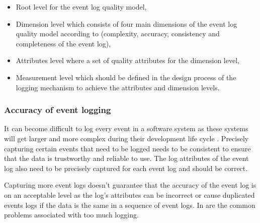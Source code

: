 \begin{itemize}
	\item Root level for the event log quality model,
	\item Dimension level which consists of four main dimensions of the event log quality model according to \cite{Kherbouche2017} (complexity, accuracy, consistency and completeness of the event log),
	\item Attributes level where a set of quality attributes for the dimension level,
	\item Measurement level which should be defined in the design process of the logging mechanism to achieve the attributes and dimension levels.
\end{itemize}

\clearpage

\subsubsection{Accuracy of event logging} 
It can become difficult to log every event in a software system as these systems will get larger and more complex during their development life cycle \cite{Stojanov2017}. Precisely capturing certain events that need to be logged needs to be consistent to ensure that the data is trustworthy and reliable to use. The log attributes of the event log also need to be precisely captured for each event log and should be correct.\par Capturing more event logs doesn't guarantee that the accuracy of the event log is on an acceptable level as the log's attributes can be incorrect or cause duplicated events logs if the data is the same in a sequence of event logs. In  are the common problems associated with too much logging.

